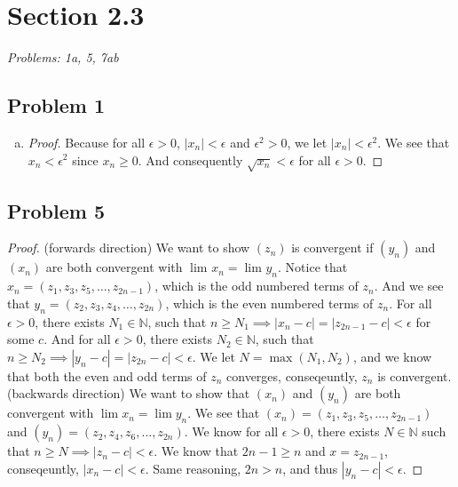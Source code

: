 \documentclass[12pt]{article}
\begin{document}

\section*{Section 2.3}
\textit{Problems: 1a, 5, 7ab}
\subsection*{Problem 1}
\begin{enumerate}[a).]
    \item {
    \begin{proof}
        Because for all $\epsilon > 0$, $|x_n| < \epsilon$ and $\epsilon^2 > 0$, we let $|x_n| < \epsilon^2$.
        We see that $x_n < \epsilon^2$ since $x_n \ge 0$. And consequently $\sqrt{x_n} < \epsilon$ for all $\epsilon > 0$. 
    \end{proof}
    }
\end{enumerate}

\subsection*{Problem 5}
        \begin{proof}
            (forwards direction) We want to show $(z_n)$ is convergent if $(y_n)$ and $(x_n)$ are both convergent with $\lim_{}x_n = \lim_{}y_n$. 
            Notice that $x_n = (z_1, z_3, z_5, \dots, z_{2n-1})$, which is the odd numbered terms of $z_n$. 
            And we see that $y_n = (z_2, z_3, z_4, \dots, z_{2n})$, which is the even numbered terms of $z_n$. 
            For all $\epsilon > 0$, there exists $N_1 \in \mathbb{N}$, such that $ n \ge N_1 \implies |x_n - c| = |z_{2n-1} - c|< \epsilon$ for some $c$. 
            And for all $\epsilon > 0$, there exists $N_2 \in \mathbb{N}$, such that $ n \ge N_2 \implies |y_n - c| = |z_{2n} - c| < \epsilon$.
            We let $N = \max{(N_1, N_2)}$, and we know that both the even and odd terms of $z_n$ converges, conseqeuntly, $z_n$ is convergent.\\

            (backwards direction) We want to show that $(x_n)$ and $(y_n)$ are both convergent with $\lim{}x_n = \lim{}y_n$.
            We see that $(x_n) = (z_1, z_3, z_5, \dots, z_{2n-1})$ and $(y_n) = (z_2, z_4, z_6, \dots, z_{2n})$. 
            We know for all $\epsilon > 0$, there exists $N \in \mathbb{N}$ such that $n \ge N \implies |z_n - c| < \epsilon$.
            We know that $2n-1 \ge n$ and $x = z_{2n-1}$, conseqeuntly, $|x_n - c| < \epsilon$. 
            Same reasoning, ${2n} > n$, and thus $|y_n - c| < \epsilon$. 
        \end{proof}
\end{document}
